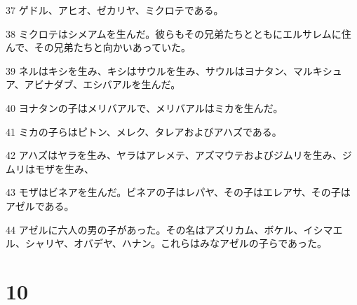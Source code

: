 \par 37 ゲドル、アヒオ、ゼカリヤ、ミクロテである。
\par 38 ミクロテはシメアムを生んだ。彼らもその兄弟たちとともにエルサレムに住んで、その兄弟たちと向かいあっていた。
\par 39 ネルはキシを生み、キシはサウルを生み、サウルはヨナタン、マルキシュア、アビナダブ、エシバアルを生んだ。
\par 40 ヨナタンの子はメリバアルで、メリバアルはミカを生んだ。
\par 41 ミカの子らはピトン、メレク、タレアおよびアハズである。
\par 42 アハズはヤラを生み、ヤラはアレメテ、アズマウテおよびジムリを生み、ジムリはモザを生み、
\par 43 モザはビネアを生んだ。ビネアの子はレパヤ、その子はエレアサ、その子はアゼルである。
\par 44 アゼルに六人の男の子があった。その名はアズリカム、ボケル、イシマエル、シャリヤ、オバデヤ、ハナン。これらはみなアゼルの子らであった。

\chapter{10}

